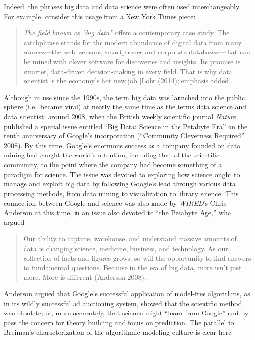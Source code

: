 \documentclass[
  letterpaper,
]{report}
\begin{document}
Indeed, the phrases big data and data science were often used
interchangeably. For example, consider this usage from a New York Times
piece:

\begin{quote}
\emph{The field known as ``big data''} offers a contemporary case study.
The catchphrase stands for the modern abundance of digital data from
many sources---the web, sensors, smartphones and corporate
databases---that can be mined with clever software for discoveries and
insights. Its promise is smarter, data-driven decision-making in every
field. That is why data scientist is the economy's hot new job {[}Lohr
(2014); emphasis added{]}.
\end{quote}

Although in use since the 1990s, the term big data was launched into the
public sphere (i.e.~became viral) at nearly the same time as the terms
data science and data scientist: around 2008, when the British weekly
scientific journal \emph{Nature} published a special issue entitled
``Big Data: Science in the Petabyte Era'' on the tenth anniversary of
Google's incorporation ({``Community Cleverness Required''} 2008). By
this time, Google's enormous success as a company founded on data mining
had caught the world's attention, including that of the scientific
community, to the point where the company had become something of a
paradigm for science. The issue was devoted to exploring how science
ought to manage and exploit big data by following Google's lead through
various data processing methods, from data mining to visualization to
library science. This connection between Google and science was also
made by \emph{WIRED}'s Chris Anderson at this time, in an issue also
devoted to ``the Petabyte Age,'' who argued:

\begin{quote}
Our ability to capture, warehouse, and understand massive amounts of
data is changing science, medicine, business, and technology. As our
collection of facts and figures grows, so will the opportunity to find
answers to fundamental questions. Because in the era of big data, more
isn't just more. More is different (Anderson 2008).
\end{quote}

Anderson argued that Google's successful application of model-free
algorithms, as in its wildly successful ad auctioning system, showed
that the scientific method was obsolete; or, more accurately, that
science might ``learn from Google'' and by-pass the concern for theory
building and focus on prediction. The parallel to Breiman's
characterization of the algorithmic modeling culture is clear here.
\end{document}
